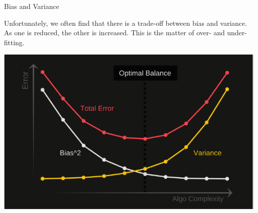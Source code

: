\documentclass[11pt]{beamer}
\begin{document}
%
%
\begin{frame}{Bias and Variance}
\begin{tcolorbox}
Unfortunately, we often find that there is a trade-off between bias and variance. As one is reduced, the other is increased. This is the matter of over- and under-fitting.
\end{tcolorbox}
\begin{center}
\includegraphics[scale=.4]{../05-pictures/lesson-2-1_pic_15.png} 
\end{center}
\end{frame}
%
\end{document}

